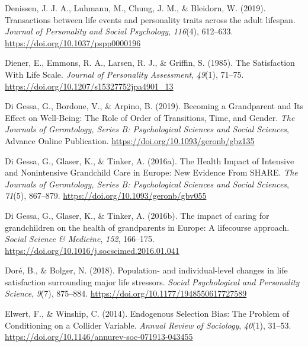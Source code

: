 \documentclass[
  english,
  man, noextraspace]{apa7}
\begin{document}
\leavevmode\hypertarget{ref-denissenTransactionsLifeEvents2019}{}%
Denissen, J. J. A., Luhmann, M., Chung, J. M., \& Bleidorn, W. (2019). Transactions between life events and personality traits across the adult lifespan. \emph{Journal of Personality and Social Psychology}, \emph{116}(4), 612--633. \url{https://doi.org/10.1037/pspp0000196}

\leavevmode\hypertarget{ref-dienerSatisfactionLifeScale1985}{}%
Diener, E., Emmons, R. A., Larsen, R. J., \& Griffin, S. (1985). The Satisfaction With Life Scale. \emph{Journal of Personality Assessment}, \emph{49}(1), 71--75. \url{https://doi.org/10.1207/s15327752jpa4901_13}

\leavevmode\hypertarget{ref-digessaBecomingGrandparentIts2019}{}%
Di Gessa, G., Bordone, V., \& Arpino, B. (2019). Becoming a Grandparent and Its Effect on Well-Being: The Role of Order of Transitions, Time, and Gender. \emph{The Journals of Gerontology, Series B: Psychological Sciences and Social Sciences}, Advance Online Publication. \url{https://doi.org/10.1093/geronb/gbz135}

\leavevmode\hypertarget{ref-digessaHealthImpactIntensive2016}{}%
Di Gessa, G., Glaser, K., \& Tinker, A. (2016a). The Health Impact of Intensive and Nonintensive Grandchild Care in Europe: New Evidence From SHARE. \emph{The Journals of Gerontology, Series B: Psychological Sciences and Social Sciences}, \emph{71}(5), 867--879. \url{https://doi.org/10.1093/geronb/gbv055}

\leavevmode\hypertarget{ref-digessaImpactCaringGrandchildren2016}{}%
Di Gessa, G., Glaser, K., \& Tinker, A. (2016b). The impact of caring for grandchildren on the health of grandparents in Europe: A lifecourse approach. \emph{Social Science \& Medicine}, \emph{152}, 166--175. \url{https://doi.org/10.1016/j.socscimed.2016.01.041}

\leavevmode\hypertarget{ref-dorePopulationIndividuallevelChanges2018}{}%
Doré, B., \& Bolger, N. (2018). Population- and individual-level changes in life satisfaction surrounding major life stressors. \emph{Social Psychological and Personality Science}, \emph{9}(7), 875--884. \url{https://doi.org/10.1177/1948550617727589}

\leavevmode\hypertarget{ref-elwertEndogenousSelectionBias2014}{}%
Elwert, F., \& Winship, C. (2014). Endogenous Selection Bias: The Problem of Conditioning on a Collider Variable. \emph{Annual Review of Sociology}, \emph{40}(1), 31--53. \url{https://doi.org/10.1146/annurev-soc-071913-043455}
\end{document}
